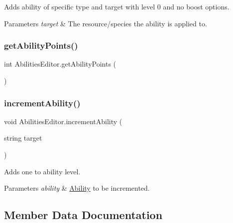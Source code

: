 Adds ability of specific type and target with level 0 and no boost options. 


\begin{DoxyParams}{Parameters}
{\em target} & The resource/species the ability is applied to.\\
\hline
\end{DoxyParams}
\mbox{\label{class_abilities_editor_a8e906d21f62b192257d3ea08a1cc0615}} 
\subsubsection{\texorpdfstring{get\+Ability\+Points()}{getAbilityPoints()}}
{\footnotesize\ttfamily int Abilities\+Editor.\+get\+Ability\+Points (\begin{DoxyParamCaption}{ }\end{DoxyParamCaption})}

\mbox{\label{class_abilities_editor_ac86ded40f4c4184a8761bef47c24c3b1}} 
\subsubsection{\texorpdfstring{increment\+Ability()}{incrementAbility()}}
{\footnotesize\ttfamily void Abilities\+Editor.\+increment\+Ability (\begin{DoxyParamCaption}\item[{string}]{target }\end{DoxyParamCaption})}



Adds one to ability level. 


\begin{DoxyParams}{Parameters}
{\em ability} & \mbox{\hyperlink{class_ability}{Ability}} to be incremented.\\
\hline
\end{DoxyParams}


\subsection{Member Data Documentation}
\mbox{\label{class_abilities_editor_a27af464d09981394e9dd4f413704c623}} 
